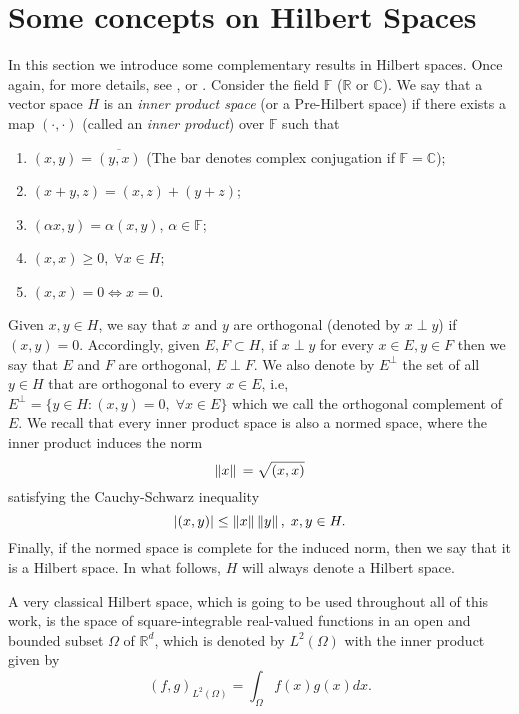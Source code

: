 \section{Some concepts on Hilbert Spaces}
In this section we introduce some complementary results in Hilbert spaces. Once again, for more details, see \cite{rudin1991functional}, \cite{brezis2011functional} or \cite{arendt2010partielle}. Consider the field \(\mathbb{F}\) (\(\mathbb{R}\) or \(\mathbb{C}\)). We say that a vector space \(H\) is an \textit{inner product space} (or a Pre-Hilbert space) if there exists a map \((\cdot,\cdot)\) (called an \textit{inner product}) over \(\mathbb{F}\) such that
\begin{enumerate}
    \item \((x, y) = \overline{(y, x)}\) (The bar denotes complex conjugation if \(\mathbb{F} = \mathbb{C}\));
    \item \((x+y,z) = (x,z)+(y+z)\);
    \item \((\alpha x, y)=\alpha(x, y)\), \(\alpha \in \mathbb{F}\);
    \item \((x, x) \geq 0, \; \forall x \in H\);
    \item \((x, x) = 0 \iff x=0\).
\end{enumerate}
Given \(x, y \in H\), we say that \(x\) and \(y\) are orthogonal (denoted by \(x \perp y\)) if \((x, y) = 0\). Accordingly, given \(E, F \subset H\), if \(x\perp y\) for every \(x \in E, y \in F\) then we say that \(E\) and \(F\) are orthogonal, \(E \perp F\). We also denote by \(E^\perp\) the set of all \(y \in H\) that are orthogonal to every \(x \in E\), i.e, \(E^\perp = \{y \in H: (x, y)=0, \; \forall x \in E\}\) which we call the orthogonal complement of \(E\). We recall that every inner product space is also a normed space, where the inner product induces the norm
\[
\norm*{x} = \sqrt{(x, x)}   
\]
satisfying the Cauchy-Schwarz inequality
\[
\abs{(x, y)} \leq \norm*{x}\norm*{y}, \; x, y \in H.
\]
Finally, if the normed space is complete for the induced norm, then we say that it is a Hilbert space. In what follows, \(H\) will always denote a Hilbert space.
\begin{example}
    A very classical Hilbert space, which is going to be used throughout all of this work, is the space of square-integrable real-valued functions in an open and bounded subset \(\Omega\) of \(\mathbb{R}^d\), which is denoted by \(L^2(\Omega)\) with the inner product given by
    \[
    (f, g)_{L^2(\Omega)} = \int_\Omega f(x)g(x) dx.
    \]
\end{example}
